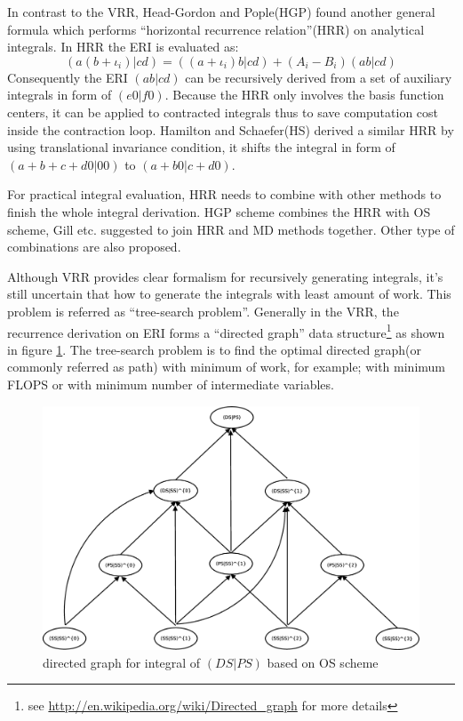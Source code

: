 In contrast to the VRR, Head-Gordon and Pople(HGP)\cite{HGP} found another general formula which 
performs ``horizontal recurrence relation''(HRR) on analytical integrals. In HRR the ERI
is evaluated as:
\begin{equation}
\label{int_paper:5}
 (a(b+\iota_{i})|cd) = ((a+\iota_{i})b|cd) + 
(A_{i} - B_{i})(ab|cd)
\end{equation}
Consequently the ERI $(ab|cd)$ can be recursively derived from a set of auxiliary integrals
in form of $(e0|f0)$. Because the HRR only involves the basis function centers,
it can be applied to contracted integrals thus to save computation cost 
inside the contraction loop. Hamilton and Schaefer\cite{new_hrr_Schaefer}(HS) derived a 
similar HRR by using translational invariance condition, it shifts the integral in form of 
$(a+b+c+d0|00)$ to $(a+b0|c+d0)$. 

For practical integral evaluation, HRR needs to combine with other
methods to finish the whole integral derivation. HGP\cite{HGP} scheme combines the HRR with OS scheme,
Gill etc. \cite{gill1989efficient, gill1990efficient}suggested to join HRR and MD methods together. 
Other type of combinations are also proposed\cite{lindh1991reduced,new_hrr_Schaefer}.

Although VRR provides clear formalism for recursively generating integrals, it's still 
uncertain that how to generate the integrals with least amount of work. This problem is 
referred as ``tree-search problem''\cite{HGP}. Generally in the VRR, the recurrence derivation on 
ERI forms a ``directed graph'' data structure\footnote{see 
\url{http://en.wikipedia.org/wiki/Directed_graph} for more details} as shown in figure \ref{fig:1}. The 
tree-search problem is to find the optimal directed graph(or commonly referred as path) with 
minimum of work, for example; with minimum FLOPS or with minimum number of intermediate variables. 

 \begin{figure}[htb]
 \centering
 \includegraphics[scale=0.25]{./graph.eps}
 \caption{directed graph for integral of $(DS|PS)$ based on OS scheme}
 \label{fig:1}
\end{figure}


